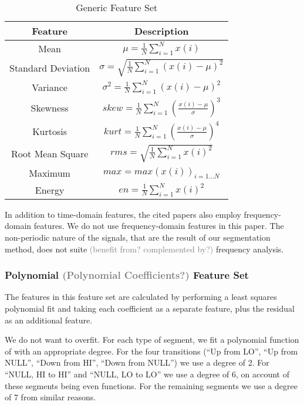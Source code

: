 \documentclass[conference]{IEEEtran}
\begin{document}
  \begin{table}
    \caption{Generic Feature Set}
    \label{tab:generic_feature_set}
    \centering
    \begin{tabular}{|c c|} 
      \hline
      Feature & Description \\ [0.5ex] 
      \hline\hline
      Mean & \(\mu = \frac{1}{N}\sum_{i=1}^{N}x(i)\) \\
      \hline
      Standard Deviation & \(\sigma = \sqrt{\frac{1}{N}\sum_{i=1}^{N}(x(i)-\mu)^2}\) \\
      \hline
      Variance & \(\sigma^2 = \frac{1}{N}\sum_{i=1}^{N}(x(i)-\mu)^2\) \\
      \hline
      Skewness & \(skew = \frac{1}{N} \sum_{i=1}^{N}(\frac{x(i)-\mu}{\sigma})^3\) \\
      \hline
      Kurtosis & \(kurt = \frac{1}{N} \sum_{i=1}^{N}(\frac{x(i)-\mu}{\sigma})^4\) \\
      \hline
      Root Mean Square & \(rms = \sqrt{\frac{1}{N}\sum_{i=1}^{N}x(i)^2}\) \\
      \hline
      Maximum & \(max = max(x(i))_{i=1...N}\) \\
      \hline
      Energy & \(en = \frac{1}{N}\sum_{i=1}^{N}x(i)^2\) \\
      \hline
    \end{tabular}
  \end{table}
  
  In addition to time-domain features, the cited papers also employ frequency-domain features. We do not use frequency-domain features in this paper. The non-periodic nature of the signals, that are the result of our segmentation method, does not suite \textcolor{gray}{(benefit from? complemented by?)} frequency analysis.

\subsubsection{Polynomial \textcolor{gray}{(Polynomial Coefficients?)} Feature Set}
  The features in this feature set are calculated by performing a least squares polynomial fit and taking each coefficient as a separate feature, plus the residual as an additional feature.
  
  We do not want to overfit. For each type of segment, we fit a polynomial function of with an appropriate degree. For the four transitions (``Up from LO'', ``Up from NULL'', ``Down from HI'', ``Down from NULL'') we use a degree of 2. For ``NULL, HI to HI'' and ``NULL, LO to LO'' we use a degree of 6, on account of these segments being even functions. For the remaining segments we use a degree of 7 from similar reasons.
  
\end{document}
